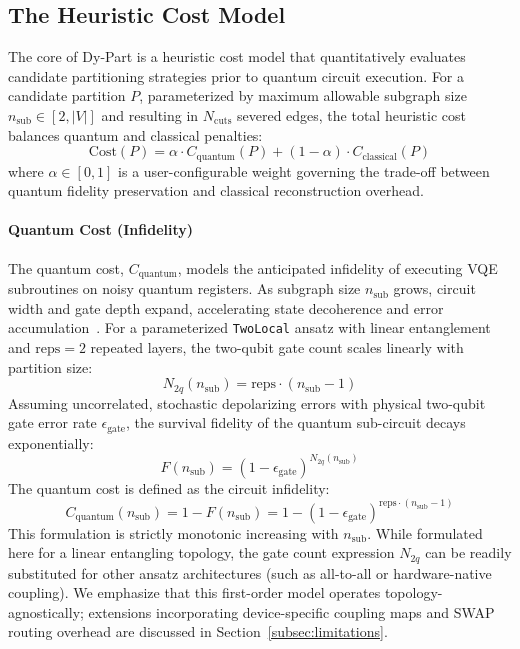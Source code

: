 \documentclass[pdflatex,sn-mathphys-num]{sn-jnl}
\theoremstyle{thmstyleone}
\theoremstyle{thmstyletwo}%
\theoremstyle{thmstylethree}%
\begin{document}
\subsection{The Heuristic Cost Model}

The core of Dy-Part is a heuristic cost model that quantitatively evaluates candidate partitioning strategies prior to quantum circuit execution. For a candidate partition $P$, parameterized by maximum allowable subgraph size $n_{\text{sub}} \in [2, |V|]$ and resulting in $N_{\text{cuts}}$ severed edges, the total heuristic cost balances quantum and classical penalties:
\begin{equation}
    \text{Cost}(P) = \alpha \cdot C_{\text{quantum}}(P) + (1 - \alpha) \cdot C_{\text{classical}}(P)
    \label{eq:total_cost}
\end{equation}
where $\alpha \in [0, 1]$ is a user-configurable weight governing the trade-off between quantum fidelity preservation and classical reconstruction overhead.

\paragraph{Quantum Cost (Infidelity)} The quantum cost, $C_{\text{quantum}}$, models the anticipated infidelity of executing VQE subroutines on noisy quantum registers. As subgraph size $n_{\text{sub}}$ grows, circuit width and gate depth expand, accelerating state decoherence and error accumulation~\cite{Nguyen2022AnEOO, Kashif2024ComputationalAIAT}. For a parameterized \texttt{TwoLocal} ansatz with linear entanglement and $\text{reps} = 2$ repeated layers, the two-qubit gate count scales linearly with partition size:
\begin{equation}
    N_{2q}(n_{\text{sub}}) = \text{reps} \cdot (n_{\text{sub}} - 1)
\end{equation}
Assuming uncorrelated, stochastic depolarizing errors with physical two-qubit gate error rate $\epsilon_{\text{gate}}$, the survival fidelity of the quantum sub-circuit decays exponentially:
\begin{equation}
    F(n_{\text{sub}}) = (1 - \epsilon_{\text{gate}})^{N_{2q}(n_{\text{sub}})}
\end{equation}
The quantum cost is defined as the circuit infidelity:
\begin{equation}
    C_{\text{quantum}}(n_{\text{sub}}) = 1 - F(n_{\text{sub}}) = 1 - (1 - \epsilon_{\text{gate}})^{\text{reps} \cdot (n_{\text{sub}} - 1)}
\end{equation}
This formulation is strictly monotonic increasing with $n_{\text{sub}}$. While formulated here for a linear entangling topology, the gate count expression $N_{2q}$ can be readily substituted for other ansatz architectures (such as all-to-all or hardware-native coupling). We emphasize that this first-order model operates topology-agnostically; extensions incorporating device-specific coupling maps and SWAP routing overhead are discussed in Section~\ref{subsec:limitations}.
\end{document}
